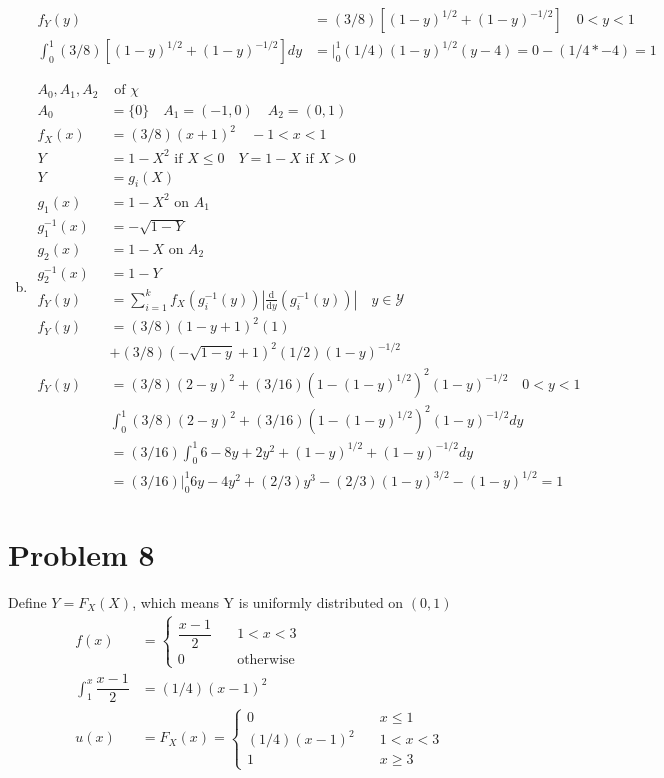 \documentclass{article}
\newcommand{\yderiv}[1]{\frac{\mathrm{d}}{\mathrm{d}y} (#1)}
\begin{document}
\begin{flushleft}
\begin{enumerate}[(a)]
\begin{align*}
f_Y(y)&=(3/8)[(1-y)^{1/2}+(1-y)^{-1/2}] \quad 0<y<1\\
\int_{0}^{1}(3/8)[(1-y)^{1/2}+(1-y)^{-1/2}] dy
&=\bigg|_{0}^{1}(1/4)(1-y)^{1/2}(y-4)=0-(1/4*-4)=1
\end{align*}
\item
\begin{align*}
A_0,A_1,A_2 &\text{ of } \chi\\
A_0&=\{0\} \quad A_1=(-1,0) \quad A_2 = (0,1)\\
f_X(x)&=(3/8)(x+1)^2 \quad -1<x<1\\
Y&=1-X^2 \text{ if } X\leq 0
\quad Y=1-X \text{ if } X>0\\
Y&=g_i(X)\\
g_1(x)&=1-X^2 \text{ on } A_1\\
g_1^{-1}(x)&=-\sqrt{1-Y}\\
g_2(x)&=1-X \text{ on } A_2\\
g_2^{-1}(x)&=1-Y\\
f_Y(y)&=\sum_{i=1}^{k}f_X(g_i^{-1}(y))\left|\yderiv{g_i^{-1}(y)}\right| \quad y \in \mathcal{Y}\\
f_Y(y)&=(3/8)(1-y+1)^2(1)\\
&+(3/8)(-\sqrt{1-y}+1)^2(1/2)(1-y)^{-1/2}\\
f_Y(y)&=(3/8)(2-y)^2+(3/16)(1-(1-y)^{1/2})^2(1-y)^{-1/2} \quad 0<y<1\\
&\int_{0}^{1}(3/8)(2-y)^2+(3/16)(1-(1-y)^{1/2})^2(1-y)^{-1/2} dy\\
&=(3/16)\int_0^{1}6-8y+2y^2+(1-y)^{1/2}+(1-y)^{-1/2} dy\\
&=(3/16)\bigg|_0^1 6y-4y^2+(2/3)y^3-(2/3)(1-y)^{3/2}-(1-y)^{1/2}=1
\end{align*}
\end{enumerate}
\section*{Problem 8}
Define $Y=F_X(X)$, which means Y is uniformly distributed on $(0,1)$
\begin{align*}
f(x)&=\begin{cases}
\dfrac{x-1}{2} \quad &1<x<3\\
0 \quad &\text{otherwise}
\end{cases}\\
\int_{1}^{x}\dfrac{x-1}{2}&=(1/4)(x-1)^2\\
u(x)&=F_X(x)=\begin{cases}
0 \quad &x\leq 1\\
(1/4)(x-1)^2 \quad &1<x<3\\
1 \quad &x\geq 3
\end{cases}
\end{align*}

\end{flushleft}
\end{document}
